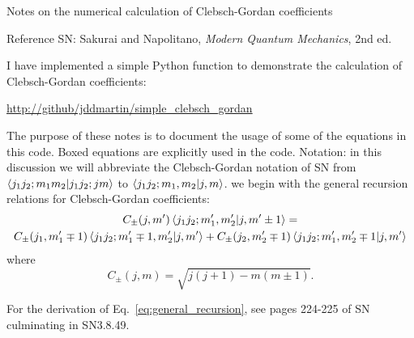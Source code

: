 \documentclass[11pt]{article}
\begin{document}
\begin{center}
{\large Notes on the numerical calculation of Clebsch-Gordan coefficients}
\end{center}

\noindent
Reference SN: Sakurai and Napolitano, {\em Modern Quantum Mechanics}, 2nd ed.

\begin{outline}
\1 I have implemented a simple Python function to demonstrate the calculation
of Clebsch-Gordan coefficients: 
\begin{center}\url{http://github/jddmartin/simple_clebsch_gordan} 
\end{center}
The purpose of these notes is to document the usage of some of the equations in
this code.  Boxed equations are explicitly used in the code.
\1 Notation: in this discussion we will abbreviate the Clebsch-Gordan notation of SN from $\braket{j_1j_2;m_1m_2|j_1j_2;jm}$ to
$\braket{j_1j_2;m_1,m_2|j,m}$.
\1 we begin with the general recursion relations for Clebsch-Gordan coefficients:
\begin{multline}
  C_{\pm}(j,m') \braket{j_1j_2;m_1',m_2'|j,m'\pm1}
    = \\
  C_{\pm}(j_1,m'_1\mp1) \braket{j_1j_2;m'_1\mp1,m'_2|j,m'}
  +
  C_{\pm}(j_2,m'_2\mp1) \braket{j_1j_2;m'_1,m'_2\mp1|j,m'}
\label{eq:general_recursion}
\end{multline}
where 
\begin{equation}
\boxed{
C_{\pm}(j,m) = \sqrt{j (j+1) - m (m\pm1)}.
}
\end{equation}

For the derivation of Eq.~\ref{eq:general_recursion}, see pages 224-225 of SN culminating in SN3.8.49.


\end{outline}
\end{document}
